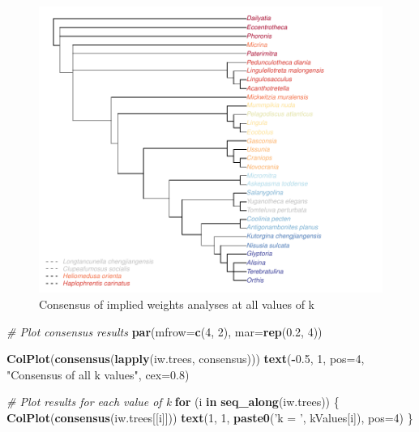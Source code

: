 \documentclass[]{book}
\newenvironment{Shaded}{\begin{snugshade}}{\end{snugshade}}
\newcommand{\KeywordTok}[1]{\textcolor[rgb]{0.13,0.29,0.53}{\textbf{#1}}}
\newcommand{\DataTypeTok}[1]{\textcolor[rgb]{0.13,0.29,0.53}{#1}}
\newcommand{\DecValTok}[1]{\textcolor[rgb]{0.00,0.00,0.81}{#1}}
\newcommand{\FloatTok}[1]{\textcolor[rgb]{0.00,0.00,0.81}{#1}}
\newcommand{\StringTok}[1]{\textcolor[rgb]{0.31,0.60,0.02}{#1}}
\newcommand{\CommentTok}[1]{\textcolor[rgb]{0.56,0.35,0.01}{\textit{#1}}}
\newcommand{\ControlFlowTok}[1]{\textcolor[rgb]{0.13,0.29,0.53}{\textbf{#1}}}
\newcommand{\OperatorTok}[1]{\textcolor[rgb]{0.81,0.36,0.00}{\textbf{#1}}}
\newcommand{\NormalTok}[1]{#1}
\theoremstyle{definition}
\theoremstyle{definition}
\theoremstyle{definition}
\theoremstyle{remark}
\begin{document}
\begin{figure}
\centering
\includegraphics{Brachiopod_phylogeny_files/figure-latex/unnamed-chunk-1-1.pdf}
\caption{\label{fig:unnamed-chunk-1}Consensus of implied weights analyses at
all values of k}
\end{figure}

\begin{Shaded}
\begin{Highlighting}[]
\CommentTok{# Plot consensus results}
\KeywordTok{par}\NormalTok{(}\DataTypeTok{mfrow=}\KeywordTok{c}\NormalTok{(}\DecValTok{4}\NormalTok{, }\DecValTok{2}\NormalTok{), }\DataTypeTok{mar=}\KeywordTok{rep}\NormalTok{(}\FloatTok{0.2}\NormalTok{, }\DecValTok{4}\NormalTok{))}

\KeywordTok{ColPlot}\NormalTok{(}\KeywordTok{consensus}\NormalTok{(}\KeywordTok{lapply}\NormalTok{(iw.trees, consensus)))}
\KeywordTok{text}\NormalTok{(}\OperatorTok{-}\FloatTok{0.5}\NormalTok{, }\DecValTok{1}\NormalTok{, }\DataTypeTok{pos=}\DecValTok{4}\NormalTok{, }\StringTok{"Consensus of all k values"}\NormalTok{, }\DataTypeTok{cex=}\FloatTok{0.8}\NormalTok{)}

\CommentTok{# Plot results for each value of k}
\ControlFlowTok{for}\NormalTok{ (i }\ControlFlowTok{in} \KeywordTok{seq_along}\NormalTok{(iw.trees)) \{}
  \KeywordTok{ColPlot}\NormalTok{(}\KeywordTok{consensus}\NormalTok{(iw.trees[[i]]))}
  \KeywordTok{text}\NormalTok{(}\DecValTok{1}\NormalTok{, }\DecValTok{1}\NormalTok{, }\KeywordTok{paste0}\NormalTok{(}\StringTok{'k = '}\NormalTok{, kValues[i]), }\DataTypeTok{pos=}\DecValTok{4}\NormalTok{)}
\NormalTok{\}}
\end{Highlighting}
\end{Shaded}
\end{document}
